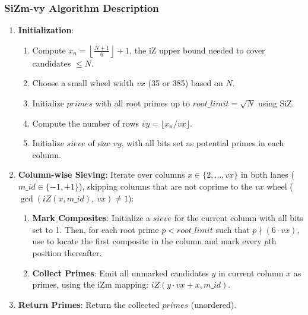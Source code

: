 \documentclass{article}
\begin{document}
\subsubsection*{SiZm-vy Algorithm Description}
\begin{enumerate}[noitemsep]
    \item \textbf{Initialization}:
    \begin{enumerate}
        \item Compute $x_n = \left\lfloor\tfrac{N+1}{6}\right\rfloor + 1$, the iZ upper bound needed to cover candidates $\le N$.
        \item Choose a small wheel width $vx$ (35 or 385) based on $N$.
        \item Initialize $primes$ with all root primes up to $root\_limit = \sqrt{N}$ using SiZ.
        \item Compute the number of rows $vy = \lfloor x_n / vx \rfloor$.
        \item Initialize $sieve$ of size $vy$, with all bits set as potential primes in each column.
    \end{enumerate}
        \item \textbf{Column-wise Sieving}: Iterate over columns $x \in \{2, \dots, vx\}$ in both lanes ($m\_id\in\{-1,+1\}$), skipping columns that are not coprime to the $vx$ wheel ($\gcd(iZ(x,m\_id),\ vx)\neq 1$):
    \begin{enumerate}
        \item \textbf{Mark Composites}: Initialize a $sieve$ for the current column with all bits set to 1. Then, for each root prime $p < root\_limit$ such that $p \nmid (6 \cdot vx)$, use  to locate the first composite in the column and mark every $p$th position thereafter.
        \item \textbf{Collect Primes}: Emit all unmarked candidates $y$ in current column $x$ as primes, using the iZm mapping: $iZ(y \cdot vx + x, m\_id)$.
    \end{enumerate}
    \item \textbf{Return Primes}: Return the collected $primes$ (unordered).
\end{enumerate}
\end{document}
